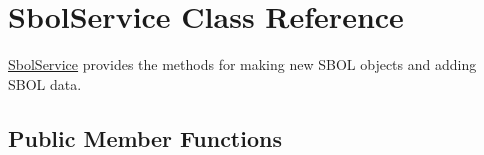 \hypertarget{classorg_1_1sbolstandard_1_1lib_s_b_o_lj_1_1_sbol_service}{
\section{SbolService Class Reference}
\label{classorg_1_1sbolstandard_1_1lib_s_b_o_lj_1_1_sbol_service}
}


\hyperlink{classorg_1_1sbolstandard_1_1lib_s_b_o_lj_1_1_sbol_service}{SbolService} provides the methods for making new SBOL objects and adding SBOL data.  


\subsection*{Public Member Functions}
